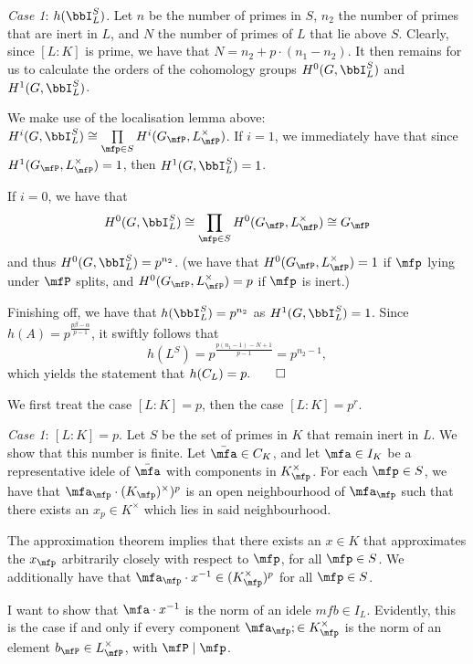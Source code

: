 \documentclass[a4paper, 12pt,oneside,openany]{book}
\begin{document}
\emph{Case 1}: $h(\bbI_L^S)$. Let $n$ be the number of primes in $S$, $n_2$ the number of primes that are inert in $L$, and $N$ the number of primes of $L$ that lie above $S$. Clearly, since $[L:K]$ is prime, we have that $N= n_2+p\cdot(n_1-n_2)$. It then remains for us to calculate the orders of the cohomology groups $H^0(G, \bbI_L^S)$ and $H^1(G, \bbI_L^S)$. 

We make use of the localisation lemma above: $H^i(G, \bbI_L^S) \cong \prod\limits_{\mfp \in S} H^i(G_\mfP, L_\mfP^\times)$. If $i=1$, we immediately have that since $H^1(G_\mfP, L_\mfP^\times)=1$, then $H^1(G, \bbI_L^S)=1$. 

If $i =0$, we have that $$H^0(G, \bbI_L^S) \cong \prod\limits_{\mfp \in S} H^0(G_\mfP, L_\mfP^\times) \cong G_\mfP$$ and thus $H^0(G, \bbI_L^S) = p^{n_2}$. (we have that $H^0(G_\mfP, L^\times_\mfP) = 1$ if $\mfp$ lying under $\mfP$ splits, and $H^0(G_\mfP, L^\times_\mfP) = p$ if $\mfp$ is inert.)

Finishing off, we have that $h(\bbI_L^S)=p^{n_2}$ as $H^1(G, \bbI_L^S)=1$. Since $h(A) = p^{\frac{p\beta-\alpha}{p-1}}$, it swiftly follows that $$h(L^S) = p^{\frac{p(n_1-1)-N+1}{p-1}}=p^{n_2-1},$$ which yields the statement that $h(C_L)=p. \qed$


 We first treat the case $[L:K]=p$, then the case $[L:K]=p^r$.

\emph{Case 1}: $[L:K]=p$. Let $S$ be the set of primes in $K$ that remain inert in $L$. We show that this number is finite. Let $\bar{\mfa} \in C_K$, and let $\mfa \in I_K$ be a representative idele of $\bar{\mfa}$ with components in $K_\mfp^\times$. For each $\mfp \in S$, we have that $\mfa_\mfp \cdot (K_\mfp)^\times)^p$ is an open neighbourhood of $\mfa_\mfp$ such that there exists an $x_p \in K^\times$ which lies in said neighbourhood.

The approximation theorem implies that there exists an $x \in K$ that approximates the $x_\mfp$ arbitrarily closely with respect to $\mfp$, for all $\mfp \in S$. We additionally have that $\mfa_\mfp \cdot x^{-1} \in (K_\mfp^\times)^p$ for all $\mfp \in S$.

I want to show that $\mfa \cdot x^{-1}$ is the norm of an idele $mfb \in I_L$. Evidently, this is the case if and only if every component $\mfa_\mfp; \in K_\mfp^\times$ is the norm of an element $b_\mfP \in L_\mfP^\times$, with $\mfP \mid \mfp$. 
\end{document}
